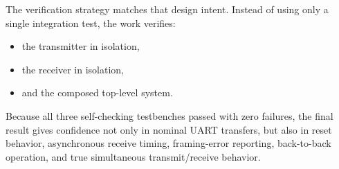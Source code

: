 \documentclass[12pt]{article}
\begin{document}
The verification strategy matches that design intent. Instead of using only a
single integration test, the work verifies:

\begin{itemize}
    \item the transmitter in isolation,
    \item the receiver in isolation,
    \item and the composed top-level system.
\end{itemize}

Because all three self-checking testbenches passed with zero failures, the final
result gives confidence not only in nominal UART transfers, but also in reset
behavior, asynchronous receive timing, framing-error reporting, back-to-back
operation, and true simultaneous transmit/receive behavior.
\end{document}
